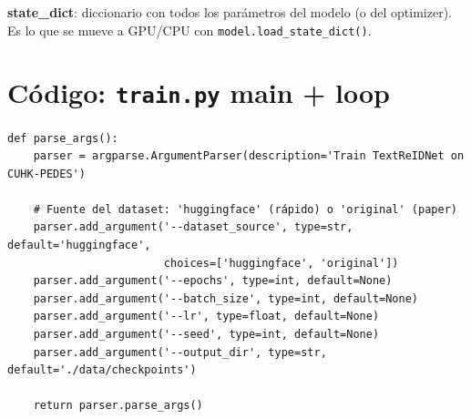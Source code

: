 \noindent\textbf{state\_dict}: diccionario con todos los
parámetros del modelo (o del optimizer). Es lo que se mueve a
GPU/CPU con \texttt{model.load\_state\_dict()}.

\section{Código: \texttt{train.py} main + loop}

\begin{verbatim}
def parse_args():
    parser = argparse.ArgumentParser(description='Train TextReIDNet on CUHK-PEDES')

    # Fuente del dataset: 'huggingface' (rápido) o 'original' (paper)
    parser.add_argument('--dataset_source', type=str, default='huggingface',
                        choices=['huggingface', 'original'])
    parser.add_argument('--epochs', type=int, default=None)
    parser.add_argument('--batch_size', type=int, default=None)
    parser.add_argument('--lr', type=float, default=None)
    parser.add_argument('--seed', type=int, default=None)
    parser.add_argument('--output_dir', type=str, default='./data/checkpoints')

    return parser.parse_args()
\end{verbatim}

